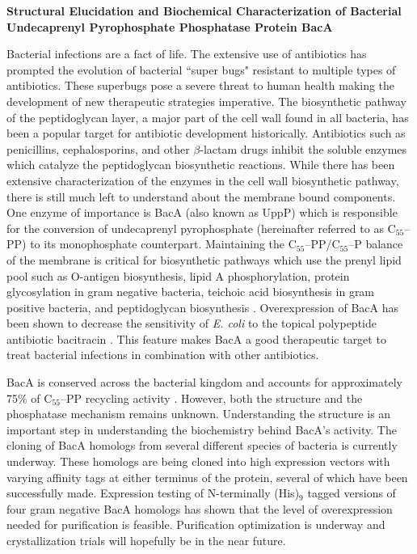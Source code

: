 \documentclass[12pt]{report}
\begin{document}
\begin{center}
{\bf Structural Elucidation and Biochemical Characterization of Bacterial Undecaprenyl Pyrophosphate Phosphatase Protein BacA}
\end{center}


\hspace*{5mm}Bacterial infections are a fact of life. The extensive use of antibiotics has prompted the evolution of bacterial ``super bugs" resistant to multiple types of antibiotics. These superbugs pose a severe threat to human health making the development of new therapeutic strategies imperative. The biosynthetic pathway of the peptidoglycan layer, a major part of the cell wall found in all bacteria, has been a popular target for antibiotic development historically. Antibiotics such as penicillins, cephalosporins, and other $\beta$-lactam drugs inhibit the soluble enzymes which catalyze the peptidoglycan biosynthetic reactions. While there has been extensive characterization of the enzymes in the cell wall biosynthetic pathway, there is still much left to understand about the membrane bound components. One enzyme of importance is BacA (also known as UppP) which is responsible for the conversion of undecaprenyl pyrophosphate (hereinafter referred to as C$_{55}$--PP) to its monophosphate counterpart. Maintaining the C$_{55}$--PP/C$_{55}$--P balance of the membrane is critical for biosynthetic pathways which use the prenyl lipid pool such as O-antigen biosynthesis, lipid A phosphorylation, protein glycosylation in gram negative bacteria, teichoic acid biosynthesis in gram positive bacteria, and peptidoglycan biosynthesis \cite{Loverling}. Overexpression of BacA has been shown to decrease the sensitivity of {\it E. coli} to the topical polypeptide antibiotic bacitracin \cite{Cain}. This feature makes BacA a good therapeutic target to treat bacterial infections in combination with other antibiotics.


\indent BacA is conserved across the bacterial kingdom and accounts for approximately 75\% of C$_{55}$--PP recycling activity \cite{Ghachi}. However, both the structure and the phosphatase mechanism remains unknown. Understanding the structure is an important step in understanding the biochemistry behind BacA's activity. The cloning of BacA homologs from several different species of bacteria is currently underway. These homologs are being cloned into high expression vectors with varying affinity tags at either terminus of the protein, several of which have been successfully made. Expression testing of N-terminally (His)$_9$ tagged versions of four gram negative BacA homologs has shown that the level of overexpression needed for purification is feasible. Purification optimization is underway and crystallization trials will hopefully be in the near future. 
\end{document}
